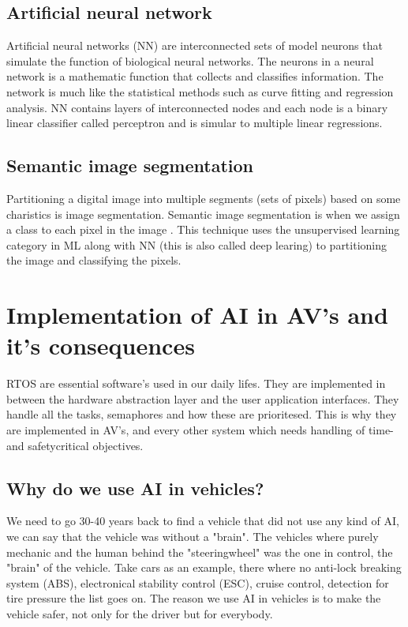 \documentclass[conference]{IEEEtran}
\begin{document}
	\subsection{Artificial neural network}
		Artificial neural networks (NN) are interconnected sets of model neurons that simulate the function of biological neural networks.
		The neurons in a neural network is a mathematic function that collects and classifies information. The network is much like the 
		statistical methods such as curve fitting and regression analysis. NN contains layers of interconnected nodes and each node 
		is a binary linear classifier called perceptron and is simular to multiple linear regressions. \cite{pedia:NN}

	\subsection{Semantic image segmentation}
		Partitioning a digital image into multiple segments (sets of pixels) based on some charistics is image segmentation. Semantic image segmentation is when we assign a class to each 
		pixel in the image \cite{towardsDataSience:SIS}. This technique uses the unsupervised learning category in ML along with NN (this is also called deep learing) to partitioning the image 
		and classifying the pixels. 


\section{Implementation of AI in AV's and it's consequences}
RTOS are essential software's used in our daily lifes. They are implemented in between the 
hardware abstraction layer and the user application interfaces. They handle all the tasks, semaphores and
how these are prioritesed. This is why they are implemented in AV's, and every other system which needs handling
of time- and safetycritical objectives.

 \subsection{Why do we use AI in vehicles?}
	We need to go 30-40 years back to find a vehicle that did not use any kind of AI, we can say that the vehicle was without a "brain". 
	The vehicles where purely mechanic and the human behind the "steeringwheel" was the one in control, the "brain" of the vehicle. 
	Take cars as an example, there where no anti-lock breaking system (ABS), electronical stability control (ESC), cruise control, detection for tire pressure
	the list goes on. The reason we use AI in vehicles is to make the vehicle safer, not only for the driver but for everybody. %
\end{document}
